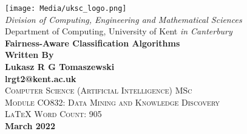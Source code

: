 \documentclass[12pt, a4paper]{article}
\begin{document}
\begin{titlepage}
    \newcommand{\HRule}{\rule{\linewidth}{0.5mm}}
    \begin{centering} 
    \texttt{[image: Media/uksc\_logo.png]} \\
    \vspace{0.5cm} 
    \large{\emph{Division of Computing, Engineering and Mathematical Sciences}} \\ [0.1cm]
    \large{{Department of Computing, University of Kent \emph{in Canterbury}}} \\ [1.5cm]
    \Huge{\bfseries{Fairness-Aware Classification Algorithms}} \\ [1.5cm]
    {\Large{\bfseries{Written By \\ [0.2cm] \LARGE{Lukasz R G Tomaszewski}}}}\\%
    {\Large{\bfseries{lrgt2@kent.ac.uk}}}\\[0.5cm]
    \textsc{\Large Computer Science (Artificial Intelligence) MSc}\\ [-0.2cm]
    \textsc{\large Module CO832: Data Mining and Knowledge Discovery}\\ %
    \textsc{\large LaTeX Word Count: 905}\\ [2cm]
    \textbf{\Large{March 2022}}\\
    \end{centering} 
    \end{titlepage}
\pagestyle{plain}
\newpage
\tableofcontents
\newpage

\pagestyle{fancy}





\newpage


\end{document}
